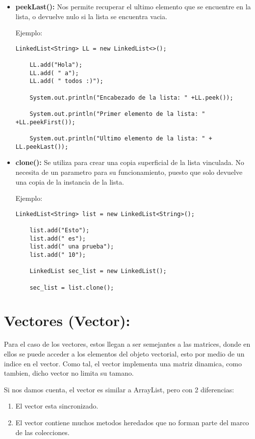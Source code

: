 \documentclass[12pt, letterpaper]{article} %
\begin{document}
\begin{itemize}
    \item \textbf{peekLast():} Nos permite recuperar el ultimo elemento que se encuentre en la lista, o devuelve nulo si la lista se encuentra vacia.

    Ejemplo:
    \lstset{language = Java, breaklines=true, basicstyle=\footnotesize}
    \begin{lstlisting}[frame=single]
    LinkedList<String> LL = new LinkedList<>();

    LL.add("Hola");  
    LL.add( " a");
    LL.add( " todos :)");

    System.out.println("Encabezado de la lista: " +LL.peek());

    System.out.println("Primer elemento de la lista: " +LL.peekFirst());

    System.out.println("Ultimo elemento de la lista: " + LL.peekLast());
    \end{lstlisting}

    \item \textbf{clone():} Se utiliza para crear una copia superficial de la lista vinculada. No necesita de un parametro para su funcionamiento, puesto que solo devuelve una copia de la instancia de la lista.

    Ejemplo:
    \lstset{language = Java, breaklines=true, basicstyle=\footnotesize}
    \begin{lstlisting}[frame=single]
    LinkedList<String> list = new LinkedList<String>();

    list.add("Esto");
    list.add(" es");
    list.add(" una prueba");
    list.add(" 10");

    LinkedList sec_list = new LinkedList();

    sec_list = list.clone();
    \end{lstlisting}
    
\end{itemize}

\section*{Vectores (Vector):}
Para el caso de los vectores, estos llegan a ser semejantes a las matrices, donde en ellos se puede acceder a los elementos del objeto vectorial, esto por medio de un indice en el vector. Como tal, el vector implementa una matriz dinamica, como tambien, dicho vector no limita su tamano.

Si nos damos cuenta, el vector es similar a ArrayList, pero con 2 diferencias:
\begin{enumerate}
    \item El vector esta sincronizado.
    \item El vector contiene muchos metodos heredados que no forman parte del marco de las colecciones.
\end{enumerate}
\end{document}
